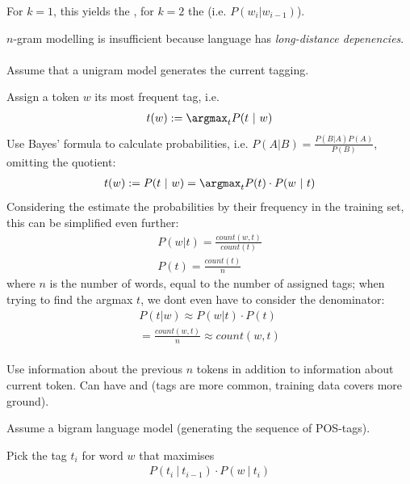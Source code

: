 \documentclass[10pt,twocolumn]{article}
\begin{document}
For $k=1$, this yields the , for $k=2$ the 
(i.e. $P(w_i | w_{i-1})$).

$n$-gram modelling is insufficient because language has \textit{long-distance depenencies}.

\paragraph{ } 
Assume that a unigram model generates the current tagging.

Assign a token $w$ its most frequent tag, i.e.
\begin{align*}
  t(w) := \argmax_t P(t~|~w)
\end{align*}
Use Bayes' formula to calculate probabilities, i.e. $P(A|B) = \frac{P(B|A)P(A)}{P(B)}$,
omitting the quotient:
\begin{align*}
  t(w) := P(t~|~w) = \argmax_t P(t) \cdot P(w~|~t)
\end{align*}
Considering the estimate the probabilities by their frequency in the training
set, this can be simplified even further:
\begin{align*}
  P(w|t) = \frac{ \mathit{count}(w,t) }{\mathit{count}(t)} \\
  P(t) = \frac{  \mathit{count}(t)}{n}
\end{align*}
where $n$ is the number of words, equal to the number of assigned tags; when
trying to find the argmax $t$, we dont even have to consider the denominator:
\begin{align*}
  P(t|w) \approx P(w|t) \cdot P(t) \\
  = \frac{\mathit{count(w,t)}}{n} \approx \mathit{count}(w,t)
\end{align*}


\paragraph{ } Use information about the previous $n$
tokens in addition to information about current token. Can have 
and  (tags are more common, training data covers more ground).

Assume a bigram language model (generating the sequence of POS-tags).

Pick the tag $t_i$ for word $w$ that maximises
\begin{align*}
  P(t_i ~|~ t_{i-1}) \cdot P(w~|~t_{i})
\end{align*}
\end{document}
